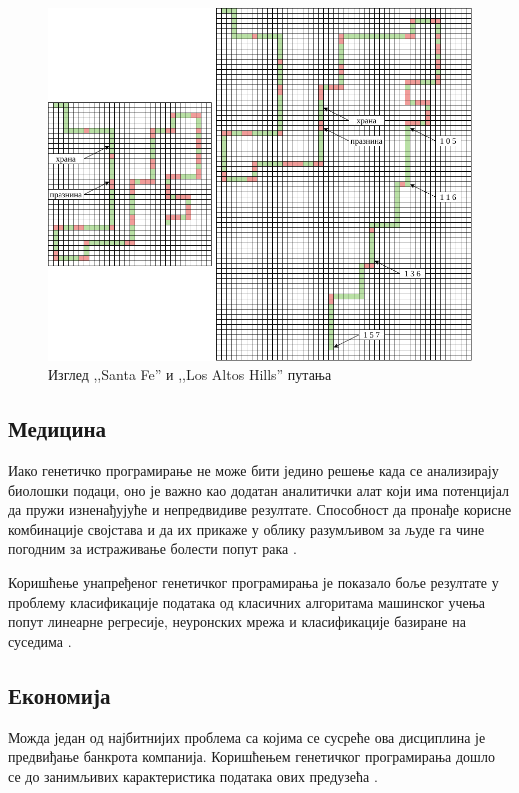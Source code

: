 \documentclass[a4paper]{article}
\begin{document}
\begin{figure}[ht!]
    \begin{center}
        \includegraphics[scale=0.35]{santa_fe.png}
    \end{center}
    \caption{Изглед ,,Santa Fe'' и ,,Los Altos Hills'' путања}
    \label{fig:santa_fe}
\end{figure}

\subsection{Медицина}
Иако генетичко програмирање не може бити једино решење када се анализирају биолошки подаци, оно је важно као додатан аналитички алат који има потенцијал да пружи изненађујуће и непредвидиве резултате. Способност да пронађе корисне комбинације својстава и да их прикаже у облику разумљивом за људе га чине погодним за истраживање болести попут рака \cite{cancer}.

Коришћење унапређеног генетичког програмирања је показало боље резултате у проблему класификације података од класичних алгоритама машинског учења попут линеарне регресије, неуронских мрежа и класификације базиране на суседима \cite{egp}.
\subsection{Економија}
Можда један од најбитнијих проблема са којима се сусреће ова дисциплина је предвиђање банкрота компанија. Коришћењем генетичког програмирања дошло се до занимљивих карактеристика података ових предузећа \cite{bankruptcy}.
\end{document}
